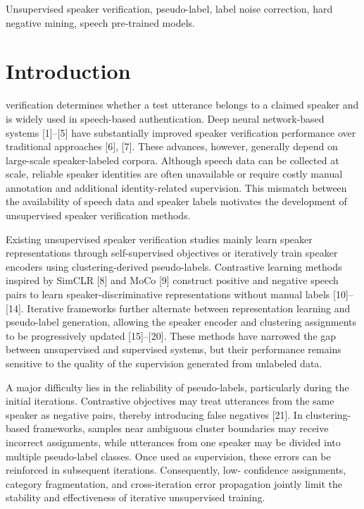 \documentclass[lettersize,journal]{IEEEtran}
\begin{document}
\begin{IEEEkeywords}
Unsupervised speaker verification, pseudo-label, label noise correction, hard negative mining, speech pre-trained models.
\end{IEEEkeywords}

\section{Introduction}
 verification determines whether a test
utterance belongs to a claimed speaker and is widely used in
speech-based authentication. Deep neural network-based systems
[1]--[5] have substantially improved speaker verification
performance over traditional approaches [6], [7]. These advances, however, generally depend on
large-scale speaker-labeled corpora. Although speech data can be
collected at scale, reliable speaker identities are often unavailable
or require costly manual annotation and additional identity-related
supervision. This mismatch between the availability of speech data
and speaker labels motivates the development of unsupervised speaker
verification methods.

Existing unsupervised speaker verification studies mainly learn
speaker representations through self-supervised objectives or
iteratively train speaker encoders using clustering-derived
pseudo-labels. Contrastive learning methods inspired by SimCLR [8]
and MoCo [9] construct positive and negative speech pairs to learn
speaker-discriminative representations without manual labels
[10]--[14]. Iterative frameworks further alternate between
representation learning and pseudo-label generation, allowing the
speaker encoder and clustering assignments to be progressively
updated [15]--[20]. These methods have narrowed the gap between
unsupervised and supervised systems, but their performance remains
sensitive to the quality of the supervision generated from unlabeled
data.

A major difficulty lies in the reliability of pseudo-labels,
particularly during the initial iterations. Contrastive objectives
may treat utterances from the same speaker as negative pairs, thereby
introducing false negatives [21]. In clustering-based frameworks,
samples near ambiguous cluster boundaries may receive incorrect
assignments, while utterances from one speaker may be divided into
multiple pseudo-label classes. Once used as supervision, these errors
can be reinforced in subsequent iterations. Consequently, low-
confidence assignments, category fragmentation, and cross-iteration
error propagation jointly limit the stability and effectiveness of
iterative unsupervised training.
\end{document}
